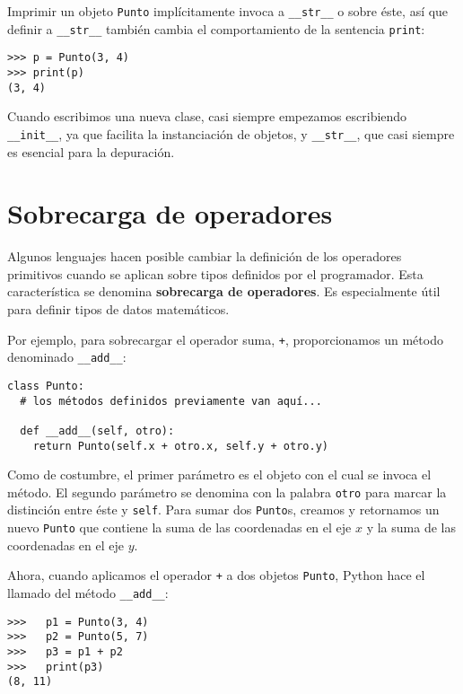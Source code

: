 Imprimir un objeto \texttt{Punto} implícitamente invoca a \texttt{\_\_str\_\_}
o sobre éste, así que definir a \texttt{\_\_str\_\_} también cambia
el comportamiento de la sentencia \texttt{print}:
\begin{verbatim}
>>> p = Punto(3, 4)
>>> print(p)
(3, 4)
\end{verbatim}

Cuando escribimos una nueva clase, casi siempre empezamos escribiendo
\texttt{\_\_init\_\_}, ya que facilita la instanciación de objetos,
y \texttt{\_\_str\_\_}, que casi siempre es esencial para la depuración.

\section{Sobrecarga de operadores}

\label{operator overloading}  
 

Algunos lenguajes hacen posible cambiar la definición de los operadores
primitivos cuando se aplican sobre tipos definidos por el programador.
Esta característica se denomina \textbf{sobrecarga de operadores}.
Es especialmente útil para definir tipos de datos matemáticos.

Por ejemplo, para sobrecargar el operador suma, \texttt{+}, proporcionamos
un método denominado \texttt{\_\_add\_\_}:
\begin{verbatim}
class Punto:
  # los métodos definidos previamente van aquí...

  def __add__(self, otro):
    return Punto(self.x + otro.x, self.y + otro.y)
\end{verbatim}

Como de costumbre, el primer parámetro es el objeto con el cual se
invoca el método. El segundo parámetro se denomina con la palabra
\texttt{otro} para marcar la distinción entre éste y \texttt{self}.
Para sumar dos \texttt{Punto}s, creamos y retornamos un nuevo \texttt{Punto}
que contiene la suma de las coordenadas en el eje $x$ y la suma de
las coordenadas en el eje $y$.

Ahora, cuando aplicamos el operador \texttt{+} a dos objetos \texttt{Punto},
Python hace el llamado del método \texttt{\_\_add\_\_}:
\begin{verbatim}
>>>   p1 = Punto(3, 4)
>>>   p2 = Punto(5, 7)
>>>   p3 = p1 + p2
>>>   print(p3)
(8, 11)
\end{verbatim}


